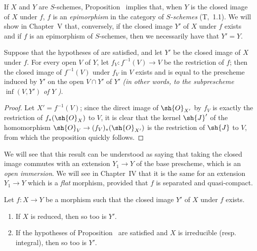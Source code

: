 \begin{remark}[9.5.7]
\label{I.9.5.7}
If $X$ and $Y$ are $S$-schemes, Proposition~ implies that,
when $Y$ is the closed image of $X$ under $f$, $f$ is an \emph{epimorphism} in the category of \emph{$S$-schemes} (T,~1.1).
We will show in Chapter~V that, conversely, if the closed image $Y'$ of $X$ under $f$ exists and if $f$ is an epimorphism of $S$-schemes, then we necessarily have that $Y'=Y$.
\end{remark}

\begin{proposition}[9.5.8]
\label{I.9.5.8}
Suppose that the hypotheses of  are satisfied, and let $Y'$ be the closed image of $X$ under $f$.
For every open $V$ of $Y$, let $f_V:f^{-1}(V)\to V$ be the restriction of $f$; then the closed image of $f^{-1}(V)$ under $f_V$ in $V$ exists and is equal to the prescheme induced by $Y'$ on the open $V\cap Y'$ of $Y'$ \emph{(in other words, to the subprescheme $\inf(V,Y')$ of $Y$ )}.
\end{proposition}

\begin{proof}
Let $X'=f^{-1}(V)$; since the direct image of $\sh{O}_{X'}$ by $f_V$ is exactly the restriction of $f_*(\sh{O}_X)$ to $V$, it is clear that the kernel $\sh{J}'$ of the homomorphism $\sh{O}_V\to(f_V)_*(\sh{O}_{X'})$ is the restriction of $\sh{J}$ to $V$, from which the proposition quickly follows.
\end{proof}

We will see that this result can be understood as saying that taking the closed image commutes with an extension $Y_1\to Y$ of the base prescheme, which is an \emph{open immersion}.
We will see in Chapter~IV that it is the same for an extension $Y_1\to Y$ which is a \emph{flat} morphism, provided that $f$ is separated and quasi-compact.

\begin{proposition}[9.5.9]
\label{I.9.5.9}
Let $f:X\to Y$ be a morphism such that the closed image $Y'$ of $X$ under $f$ exists.
\begin{enumerate}
  \item[{\rm(i)}] If $X$ is reduced, then so too is $Y'$.
  \item[{\rm(ii)}] If the hypotheses of Proposition~ are satisfied and $X$ is irreducible (resp. integral), then so too is $Y'$.
\end{enumerate}
\end{proposition}

